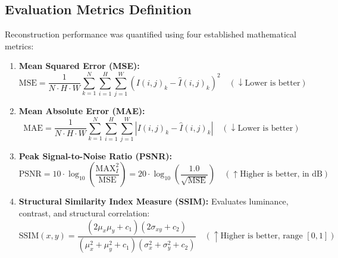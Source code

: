 \documentclass[12pt, a4paper]{article}
\begin{document}
\subsection{Evaluation Metrics Definition}
Reconstruction performance was quantified using four established mathematical metrics:
\begin{enumerate}[label=\textbf{\alph*.}]
    \item \textbf{Mean Squared Error (MSE):}
    \begin{equation}
        \text{MSE} = \frac{1}{N \cdot H \cdot W} \sum_{k=1}^N \sum_{i=1}^H \sum_{j=1}^W (I(i,j)_k - \hat{I}(i,j)_k)^2 \quad (\downarrow \text{Lower is better})
    \end{equation}
    \item \textbf{Mean Absolute Error (MAE):}
    \begin{equation}
        \text{MAE} = \frac{1}{N \cdot H \cdot W} \sum_{k=1}^N \sum_{i=1}^H \sum_{j=1}^W |I(i,j)_k - \hat{I}(i,j)_k| \quad (\downarrow \text{Lower is better})
    \end{equation}
    \item \textbf{Peak Signal-to-Noise Ratio (PSNR):}
    \begin{equation}
        \text{PSNR} = 10 \cdot \log_{10}\left(\frac{\text{MAX}_I^2}{\text{MSE}}\right) = 20 \cdot \log_{10}\left(\frac{1.0}{\sqrt{\text{MSE}}}\right) \quad (\uparrow \text{Higher is better, in dB})
    \end{equation}
    \item \textbf{Structural Similarity Index Measure (SSIM):} Evaluates luminance, contrast, and structural correlation:
    \begin{equation}
        \text{SSIM}(x, y) = \frac{(2\mu_x \mu_y + c_1)(2\sigma_{xy} + c_2)}{(\mu_x^2 + \mu_y^2 + c_1)(\sigma_x^2 + \sigma_y^2 + c_2)} \quad (\uparrow \text{Higher is better, range } [0, 1])
    \end{equation}
\end{enumerate}
\end{document}
